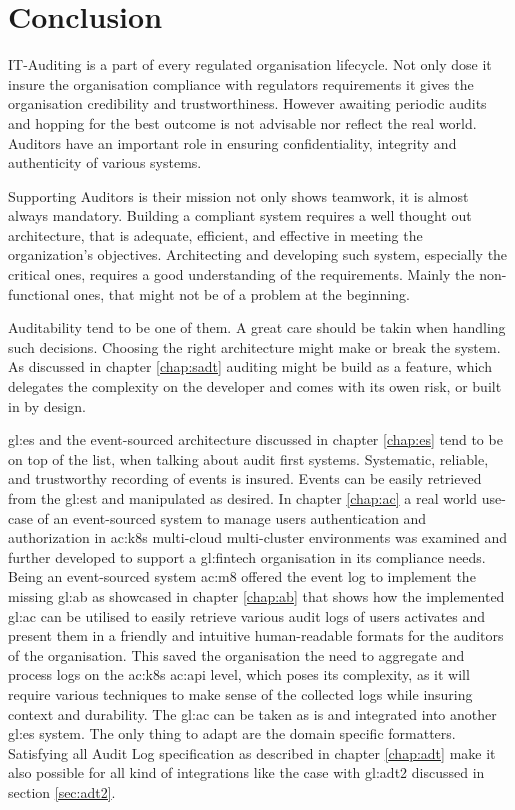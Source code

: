 %
\chapter{Conclusion}

IT-Auditing is a part of every regulated organisation lifecycle. Not only dose it insure the organisation compliance with regulators requirements it gives the organisation credibility and trustworthiness.  However awaiting periodic audits and hopping for the best outcome is not advisable nor reflect the real world. Auditors have an important role in ensuring confidentiality, integrity and authenticity of various systems.

Supporting Auditors is their mission not only shows teamwork, it is almost always mandatory. Building a compliant system requires a well thought out architecture, that is adequate, efficient, and effective in meeting the organization’s objectives. Architecting and developing such system, especially the critical ones, requires a good understanding of the requirements. Mainly the non-functional ones, that might not be of a problem at the beginning.

Auditability tend to be one of them. A great care should be takin when handling such decisions. Choosing the right architecture might make or break the system. As discussed in chapter \ref{chap:sadt} auditing might be build as a feature, which delegates the complexity on the developer and comes with its owen risk, or built in by design.

\gls{gl:es} and the event-sourced architecture discussed in chapter \ref{chap:es} tend to be on top of the list, when talking about audit first systems. Systematic, reliable, and trustworthy recording of events is insured. Events can be easily retrieved from the \gls{gl:est} and manipulated as desired. In chapter \ref{chap:ac} a real world use-case of an event-sourced system to manage users authentication and authorization in \gls{ac:k8s} multi-cloud multi-cluster environments was examined and further developed to support a \gls{gl:fintech} organisation in its compliance needs. Being an event-sourced system \gls{ac:m8} offered the event log to implement the missing \gls{gl:ab} as showcased in chapter \ref{chap:ab} that shows how the implemented \gls{gl:ac} can be utilised to easily retrieve various audit logs of users activates and present them in a friendly and intuitive human-readable formats for the auditors of the organisation. This saved the organisation the need to aggregate and process logs on the \gls{ac:k8s} \gls{ac:api} level, which poses its complexity, as it will require various techniques to make sense of the collected logs while insuring context and durability. The \gls{gl:ac} can be taken as is and integrated into another \gls{gl:es} system. The only thing to adapt are the domain specific formatters. Satisfying all Audit Log specification as described in chapter \ref{chap:adt} make it also possible for all kind of integrations like the case with \gls{gl:adt2} discussed in section \ref{sec:adt2}. 

